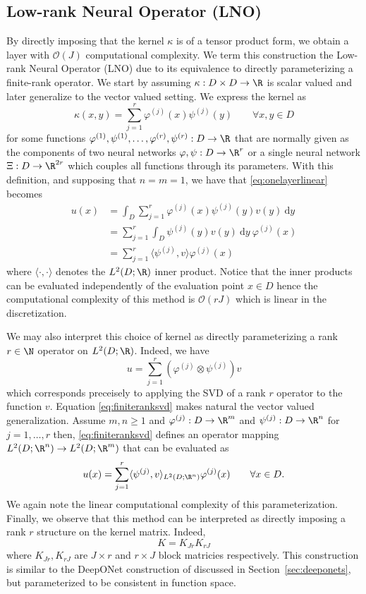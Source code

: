 
\subsection{Low-rank Neural Operator (LNO)}
\label{sec:lowrank}
By directly imposing that the kernel \(\kappa\) is of a tensor product form, we obtain a layer with \(\mathcal{O}(J)\) computational complexity. We term this construction the Low-rank Neural Operator (LNO) due to its equivalence to directly parameterizing a finite-rank operator. We start by assuming \(\kappa : D \times D \to \R\) is scalar valued and later generalize to the vector valued setting. We express the kernel as
\[\kappa(x,y) = \sum_{j=1}^r \varphi^{(j)}(x) \psi^{(j)}(y) \qquad \forall x,y \in D\]
for some functions \(\varphi^{(1)},\psi^{(1)},\dots,\varphi^{(r)},\psi^{(r)} : D \to \R\) that are normally given as the components of two neural networks \(\varphi, \psi : D \to \R^r\) or a single neural network \(\Xi : D \to \R^{2r}\) which couples all functions through its parameters. With this definition, and supposing that \(n=m=1\), we have that \eqref{eq:onelayerlinear} becomes
\begin{align*}
    u(x) &= \int_D \sum_{j=1}^r \varphi^{(j)}(x) \psi^{(j)}(y) v(y) \: \text{d}y \\ 
    &= \sum_{j=1}^r \int_D \psi^{(j)} (y) v(y) \: \text{d}y \: \varphi^{(j)}(x) \\
    &= \sum_{j=1}^r \langle \psi^{(j)}, v \rangle \varphi^{(j)} (x)
\end{align*}
where \(\langle \cdot, \cdot \rangle\) denotes the \(L^2(D;\R)\) inner product. Notice that the inner products can be evaluated independently of the evaluation point \(x \in D\) hence the computational complexity of this method is \(\mathcal{O}(rJ)\) which is linear in the discretization. 

We may also interpret this choice of kernel as directly parameterizing a rank \(r \in \N\) operator on \(L^2(D;\R)\). Indeed, we have
\begin{equation}
    \label{eq:finiteranksvd}
    u = \sum_{j=1}^r (\varphi^{(j)} \otimes \psi^{(j)}) v 
\end{equation}
which corresponds preceisely to applying the SVD of a rank \(r\) operator to the function \(v\). Equation \eqref{eq:finiteranksvd} makes natural the vector valued generalization. Assume \(m, n \geq 1\) and \(\varphi^{(j)}: D \to \R^m\) and \(\psi^{(j)} : D \to \R^n\) for \(j=1,\dots,r\) then, \eqref{eq:finiteranksvd} defines an operator mapping 
\(L^2(D;\R^n) \to L^2(D;\R^m)\) that can be evaluated as
\[u(x) = \sum_{j=1}^r \langle \psi^{(j)}, v \rangle_{L^2(D;\R^n)} \varphi^{(j)}(x) \qquad \forall x  \in D.\]
We again note the linear computational complexity of this parameterization. Finally, we observe that this method can be interpreted as directly imposing a rank \(r\) structure on the kernel matrix. Indeed,
\[K = K_{Jr} K_{rJ}\]
where \(K_{Jr}, K_{rJ}\) are \(J \times r\) and \(r \times J\) block matricies respectively. 
This construction is similar to the DeepONet construction of \cite{lu2019deeponet} discussed in Section~\ref{sec:deeponets}, but parameterized to be consistent in function space.


